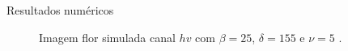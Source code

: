 \documentclass[10pt]{beamer}
\begin{document}
\begin{frame}{Resultados numéricos}
\begin{figure}[hbt]
	\caption{Imagem flor simulada canal $hv$ com $\beta = 25$, $\delta = 155$ e $\nu = 5$ .}
\endminipage\hfill
{}

\end{figure}
\end{frame}
\end{document}
